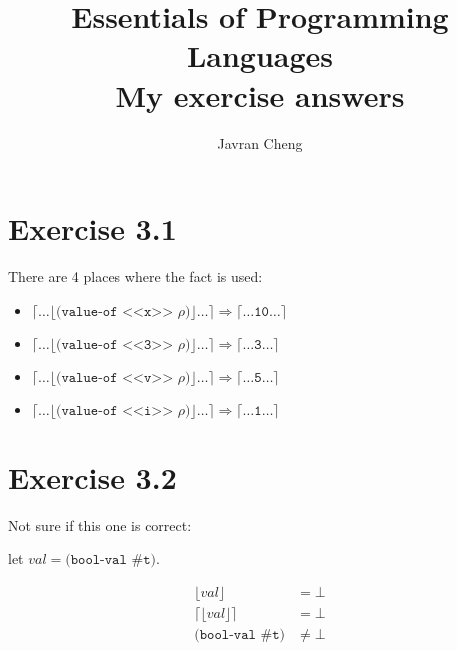 \documentclass[11pt,a4paper]{article}
\title{Essentials of Programming Languages\\
{\large
My exercise answers}}
\author{Javran Cheng}
\begin{document}
\maketitle

\section{Exercise 3.1}

There are 4 places where the fact is used:

\begin{itemize}
    \item$  \lceil \dots \lfloor
                \texttt{(value-of <<x>> $\rho$)}
            \rfloor \dots \rceil
         \Rightarrow
            \lceil \dots
                \texttt{10}
            \dots \rceil$
    \item$  \lceil \dots \lfloor
                \texttt{(value-of <<3>> $\rho$)}
            \rfloor \dots \rceil
         \Rightarrow
            \lceil \dots
                \texttt{3}
            \dots \rceil$
    \item$  \lceil \dots \lfloor
                \texttt{(value-of <<v>> $\rho$)}
            \rfloor \dots \rceil
         \Rightarrow
            \lceil \dots
                \texttt{5}
            \dots \rceil$
    \item$  \lceil \dots \lfloor
                \texttt{(value-of <<i>> $\rho$)}
            \rfloor \dots \rceil
         \Rightarrow
            \lceil \dots
                \texttt{1}
            \dots \rceil$

\end{itemize}

\section{Exercise 3.2}

Not sure if this one is correct:

let $val = \texttt{(bool-val \#t)}$.

\begin{align*}
    \lfloor val \rfloor & = \bot \\
    \lceil \lfloor val \rfloor \rceil  & = \bot \\
    \texttt{(bool-val \#t)} & \neq \bot
\end{align*}
    
\end{document}
